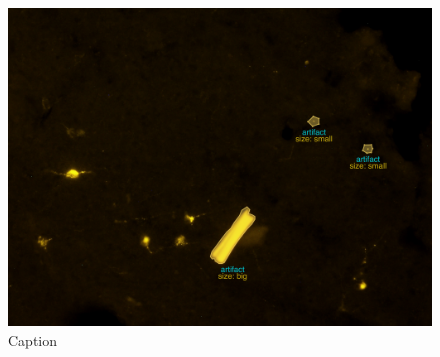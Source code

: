 \begin{landscape}
\begin{figure}
    \centering
    \includegraphics[width=\linewidth]{figures/120_dataset/challenges/artifacts.pdf}
    \caption{Caption}
    \label{fig:artifacts:macaroon}
\end{figure}
\end{landscape}